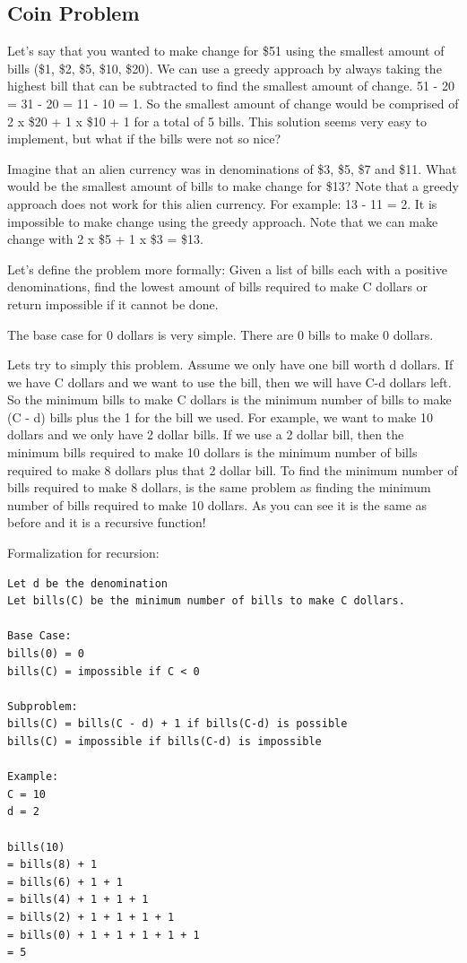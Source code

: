 \documentclass[11pt,oneside]{book}
\begin{document}
\subsection{Coin Problem}

Let's say that you wanted to make change for \$51 using the smallest amount of bills (\$1, \$2, \$5, \$10, \$20). We can use a greedy approach by always taking the highest bill that can be subtracted to find the smallest amount of change. 51 - 20 = 31 - 20 = 11 - 10 = 1. So the smallest amount of change would be comprised of 2 x \$20 + 1 x \$10 + 1 for a total of 5 bills. This solution seems very easy to implement, but what if the bills were not so nice?

Imagine that an alien currency was in denominations of \$3, \$5, \$7 and \$11. What would be the smallest amount of bills to make change for \$13? Note that a greedy approach does not work for this alien currency. For example: 13 - 11 = 2. It is impossible to make change using the greedy approach. Note that we can make change with 2 x \$5 + 1 x \$3 = \$13.

Let's define the problem more formally: Given a list of bills each with a positive denominations, find the lowest amount of bills required to make C dollars or return impossible if it cannot be done.

The base case for 0 dollars is very simple. There are 0 bills to make 0 dollars.

Lets try to simply this problem. Assume we only have one bill worth d dollars. If we have C dollars and we want to use the bill, then we will have C-d dollars left. So the minimum bills to make C dollars is the minimum number of bills to make (C - d) bills plus the 1 for the bill we used. For example, we want to make 10 dollars and we only have 2 dollar bills. If we use a 2 dollar bill, then the minimum bills required to make 10 dollars is the minimum number of bills required to make 8 dollars plus that 2 dollar bill. To find the minimum number of bills required to make 8 dollars, is the same problem as finding the minimum number of bills required to make 10 dollars. As you can see it is the same as before and it is a recursive function!

Formalization for recursion:

\begin{lstlisting}
Let d be the denomination
Let bills(C) be the minimum number of bills to make C dollars.

Base Case:
bills(0) = 0
bills(C) = impossible if C < 0

Subproblem:
bills(C) = bills(C - d) + 1 if bills(C-d) is possible
bills(C) = impossible if bills(C-d) is impossible

Example:
C = 10
d = 2

bills(10) 
= bills(8) + 1
= bills(6) + 1 + 1
= bills(4) + 1 + 1 + 1
= bills(2) + 1 + 1 + 1 + 1
= bills(0) + 1 + 1 + 1 + 1 + 1
= 5
\end{lstlisting}
\end{document}
